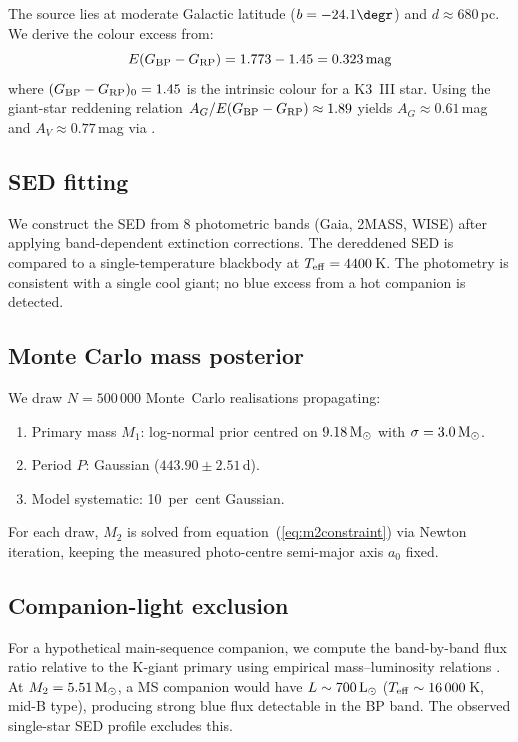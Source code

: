 \documentclass[usenatbib,fleqn]{mnras}
\newcommand{\Msun}{{\rm M}_\odot}
\newcommand{\Lsun}{{\rm L}_\odot}
\begin{document}
The source lies at moderate Galactic latitude ($b = -24.1\degr$)
and $d \approx 680$\,pc.  We derive the colour excess from:
\begin{equation}
E(G_{\rm BP} - G_{\rm RP}) = 1.773 - 1.45 = 0.323\,{\rm mag}
\end{equation}
where $(G_{\rm BP} - G_{\rm RP})_0 = 1.45$ is the intrinsic
colour for a K3~III star.  Using the giant-star reddening relation
$A_G / E(G_{\rm BP} - G_{\rm RP}) \approx 1.89$
\citep{GaiaCollaboration2023} yields $A_G \approx 0.61$\,mag and
$A_V \approx 0.77$\,mag via \citet{Cardelli1989}.

\subsection{SED fitting}
\label{sec:methods:sed}

We construct the SED from 8 photometric bands (Gaia, 2MASS, WISE)
after applying band-dependent extinction corrections.  The
dereddened SED is compared to a single-temperature blackbody at
$T_{\rm eff} = 4400$\,K.  The photometry is consistent with a
single cool giant; no blue excess from a hot companion is detected.

\subsection{Monte Carlo mass posterior}
\label{sec:methods:mc}

We draw $N = 500\,000$ Monte~Carlo realisations propagating:
\begin{enumerate}
\item Primary mass $M_1$: log-normal prior centred on
  $9.18\,\Msun$ with $\sigma = 3.0\,\Msun$.
\item Period $P$: Gaussian ($443.90 \pm 2.51$\,d).
\item Model systematic: 10~per~cent Gaussian.
\end{enumerate}
For each draw, $M_2$ is solved from
equation~(\ref{eq:m2constraint}) via Newton iteration, keeping the
measured photo-centre semi-major axis $a_0$ fixed.

\subsection{Companion-light exclusion}
\label{sec:methods:companion}

For a hypothetical main-sequence companion, we compute the
band-by-band flux ratio relative to the K-giant primary using
empirical mass--luminosity relations \citep{Eker2018}.  At
$M_2 = 5.51\,\Msun$, a MS companion would have
$L \sim 700\,\Lsun$ ($T_{\rm eff} \sim 16\,000$\,K, mid-B type),
producing strong blue flux detectable in the BP band.  The
observed single-star SED profile excludes this.
\end{document}
